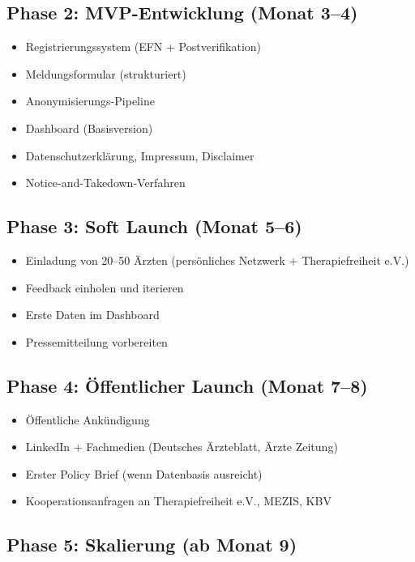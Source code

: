 \documentclass{umbruch-position}
\begin{document}
\subsection{Phase 2: MVP-Entwicklung (Monat 3–4)}

\begin{itemize}[nosep]
  \item [{[ ]}] Registrierungssystem (EFN + Postverifikation)
  \item [{[ ]}] Meldungsformular (strukturiert)
  \item [{[ ]}] Anonymisierungs-Pipeline
  \item [{[ ]}] Dashboard (Basisversion)
  \item [{[ ]}] Datenschutzerklärung, Impressum, Disclaimer
  \item [{[ ]}] Notice-and-Takedown-Verfahren
\end{itemize}

\subsection{Phase 3: Soft Launch (Monat 5–6)}

\begin{itemize}[nosep]
  \item [{[ ]}] Einladung von 20–50 Ärzten (persönliches Netzwerk + Therapiefreiheit e.V.)
  \item [{[ ]}] Feedback einholen und iterieren
  \item [{[ ]}] Erste Daten im Dashboard
  \item [{[ ]}] Pressemitteilung vorbereiten
\end{itemize}

\subsection{Phase 4: Öffentlicher Launch (Monat 7–8)}

\begin{itemize}[nosep]
  \item [{[ ]}] Öffentliche Ankündigung
  \item [{[ ]}] LinkedIn + Fachmedien (Deutsches Ärzteblatt, Ärzte Zeitung)
  \item [{[ ]}] Erster Policy Brief (wenn Datenbasis ausreicht)
  \item [{[ ]}] Kooperationsanfragen an Therapiefreiheit e.V., MEZIS, KBV
\end{itemize}

\subsection{Phase 5: Skalierung (ab Monat 9)}
\end{document}
